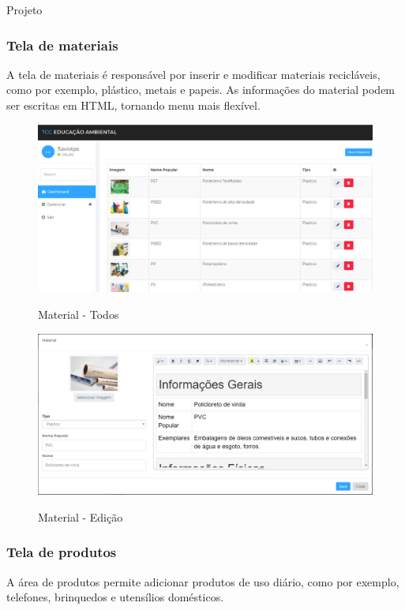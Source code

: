 \documentclass[
	12pt,				%
	openright,			%
	twoside,			%
	a4paper,			%
	english,			%
	french,				%
	spanish,			%
	brazil				%
	]{abntex2}
\begin{document}
\begin{chapter}{Projeto}
\subsubsection{Tela de materiais} \label{tela_material}
A tela de materiais é responsável por inserir e modificar materiais recicláveis, como por exemplo, plástico, metais e papeis. As informações do material podem ser escritas em HTML, tornando menu mais flexível.
\begin{figure}[h]
\centering
   \caption{Material - Todos}
   \includegraphics[scale=0.45]{media/tela_material_site_1.png}
     \label{fig:tela_material_site_1}
\end{figure}

\begin{figure}[h]
\centering
   \caption{Material - Edição}
   \includegraphics[scale=0.40]{media/tela_material_site_2.png}
     \label{fig:tela_material_site_2}
\end{figure}

\newpage
\subsubsection{Tela de produtos} \label{tela_produtos}
A área de produtos permite adicionar produtos de uso diário, como por exemplo, telefones, brinquedos e utensílios domésticos. 


\end{chapter}
\end{document}
